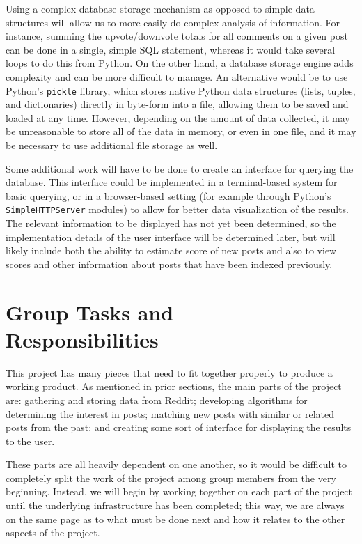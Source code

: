 \documentclass{acm_proc_article-sp}
\begin{document}
Using a complex database storage mechanism as opposed to simple data structures will allow us to more
easily do complex analysis of information.  For instance, summing the upvote/downvote totals for all
comments on a given post can be done in a single, simple SQL statement, whereas it would take several
loops to do this from Python.  On the other hand, a database storage engine adds complexity and can
be more difficult to manage.  An alternative would be to use Python's \texttt{pickle} library, which
stores native Python data structures (lists, tuples, and dictionaries) directly in byte-form into a file,
allowing them to be saved and loaded at any time.  However, depending on the amount of data collected,
it may be unreasonable to store all of the data in memory, or even in one file, and it may be necessary
to use additional file storage as well.

\balancecolumns

Some additional work will have to be done to create an interface for querying the database.  This
interface could be implemented in a terminal-based system for basic querying, or in a
browser-based setting (for example through Python's \texttt{SimpleHTTPServer} modules) to allow
for better data visualization of the results.  The relevant information to be displayed has not
yet been determined, so the implementation details of the user interface will be determined later,
but will likely include both the ability to estimate score of new posts and also to view scores
and other information about posts that have been indexed previously.


\section{Group Tasks and \\Responsibilities}

This project has many pieces that need to fit together properly to produce a working product.
As mentioned in prior sections, the main parts of the project are: gathering and storing data
from Reddit; developing algorithms for determining the interest in posts; matching new posts
with similar or related posts from the past; and creating some sort of interface for
displaying the results to the user.

These parts are all heavily dependent on one another, so it would be difficult to completely
split the work of the project among group members from the very beginning.  Instead, we will
begin by working together on each part of the project until the underlying infrastructure
has been completed; this way, we are always on the same page as to what must be done next
and how it relates to the other aspects of the project.
\end{document}
